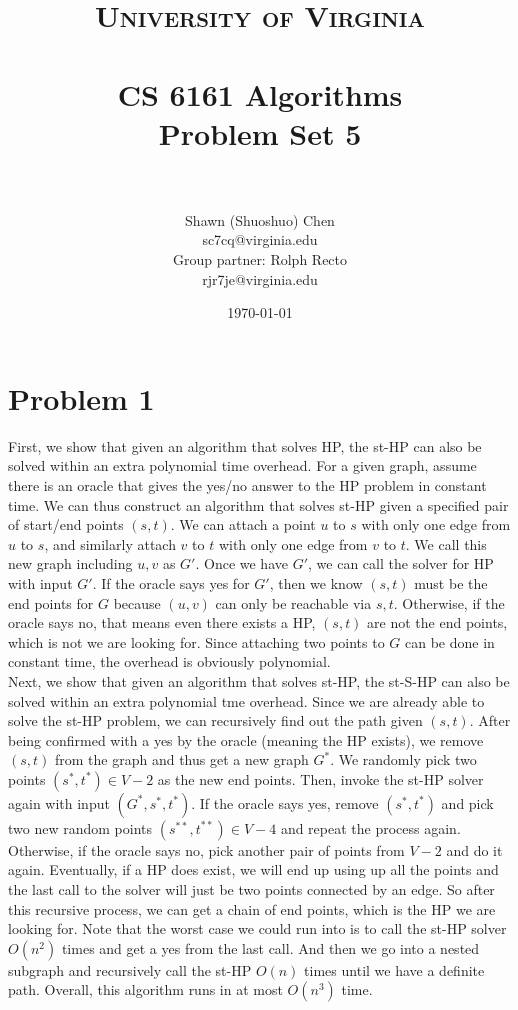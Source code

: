 \documentclass[titlepage, paper=a4, fontsize=11pt]{scrartcl} %
\title{	
\normalfont \normalsize 
\textsc{University of Virginia} \\ [25pt] %
\horrule{0.5pt} \\[0.4cm] %
\huge CS 6161 Algorithms \\
\huge Problem Set 5 \\ %
\horrule{2pt} \\[0.5cm] %
}
\author{Shawn (Shuoshuo) Chen\\sc7cq@virginia.edu\\Group partner: Rolph Recto\\ rjr7je@virginia.edu}
\date{\normalsize\today} %
\numberwithin{equation}{section} %
\numberwithin{figure}{section} %
\numberwithin{table}{section} %
\begin{document}
\maketitle %


\section*{Problem 1}
First, we show that given an algorithm that solves HP, the st-HP can also be solved within an extra polynomial time overhead. For a given graph, assume there is an oracle that gives the yes/no answer to the HP problem in constant time. We can thus construct an algorithm that solves st-HP given a specified pair of start/end points $(s,t)$. We can attach a point $u$ to $s$ with only one edge from $u$ to $s$, and similarly attach $v$ to $t$ with only one edge from $v$ to $t$. We call this new graph including $u,v$ as $G'$. Once we have $G'$, we can call the solver for HP with input $G'$. If the oracle says yes for $G'$, then we know $(s,t)$ must be the end points for $G$ because $(u,v)$ can only be reachable via $s,t$. Otherwise, if the oracle says no, that means even there exists a HP, $(s,t)$ are not the end points, which is not we are looking for. Since attaching two points to $G$ can be done in constant time, the overhead is obviously polynomial. \\

Next, we show that given an algorithm that solves st-HP, the st-S-HP can also be solved within an extra polynomial tme overhead. Since we are already able to solve the st-HP problem, we can recursively find out the path given $(s,t)$. After being confirmed with a yes by the oracle (meaning the HP exists), we remove $(s,t)$ from the graph and thus get a new graph $G^*$. We randomly pick two points $(s^*,t^*) \in V-2$ as the new end points. Then, invoke the st-HP solver again with input $(G^*,s^*,t^*)$. If the oracle says yes, remove $(s^*,t^*)$ and pick two new random points $(s^{**},t^{**}) \in V-4$ and repeat the process again. Otherwise, if the oracle says no, pick another pair of points from $V-2$ and do it again. Eventually, if a HP does exist, we will end up using up all the points and the last call to the solver will just be two points connected by an edge. So after this recursive process, we can get a chain of end points, which is the HP we are looking for. Note that the worst case we could run into is to call the st-HP solver $O(n^2)$ times and get a yes from the last call. And then we go into a nested subgraph and recursively call the st-HP $O(n)$ times until we have a definite path. Overall, this algorithm runs in at most $O(n^3)$ time. \\
\end{document}
